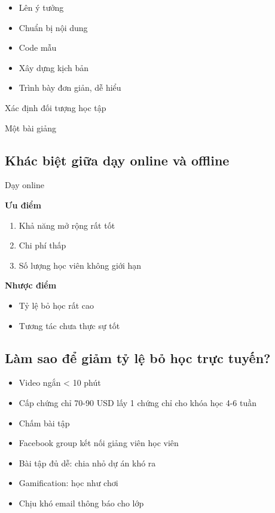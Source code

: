 \begin{itemize}
  \item Lên ý tưởng
  \item Chuẩn bị nội dung
  \item Code mẫu
  \item Xây dựng kịch bản
  \item Trình bày đơn giản, dễ hiểu
\end{itemize}

Xác định đối tượng học tập

Một bài giảng

\subsection{Khác biệt giữa dạy online và offline}

Dạy online

\textbf{Ưu điểm}

\begin{enumerate}
  \item Khả năng mở rộng rất tốt
  \item Chi phí thấp
  \item Số lượng học viên không giới hạn
\end{enumerate}

\textbf{Nhược điểm}

\begin{itemize}
  \item Tỷ lệ bỏ học rất cao
  \item Tương tác chưa thực sự tốt
\end{itemize}

\subsection{Làm sao để giảm tỷ lệ bỏ học trực tuyến?}

\begin{itemize}
  \item Video ngắn < 10 phút
  \item Cấp chứng chỉ 70-90 USD lấy 1 chứng chỉ cho khóa học 4-6 tuần
  \item Chấm bài tập
  \item Facebook group kết nối giảng viên học viên
  \item Bài tập đủ dễ: chia nhỏ dự án khó ra
  \item Gamification: học như chơi
  \item Chịu khó email thông báo cho lớp
\end{itemize}

